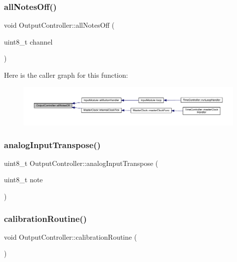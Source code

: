 \subsubsection{\texorpdfstring{all\+Notes\+Off()}{allNotesOff()}}
{\footnotesize\ttfamily void Output\+Controller\+::all\+Notes\+Off (\begin{DoxyParamCaption}\item[{uint8\+\_\+t}]{channel }\end{DoxyParamCaption})}

Here is the caller graph for this function\+:
\nopagebreak
\begin{figure}[H]
\begin{center}
\leavevmode
\includegraphics[width=350pt]{class_output_controller_abd6a1e2af3b0e92a53f5e16292958c10_icgraph}
\end{center}
\end{figure}
\mbox{\label{class_output_controller_a0996e6ff4b474cc584d532f8b05416ac}} 
\subsubsection{\texorpdfstring{analog\+Input\+Transpose()}{analogInputTranspose()}}
{\footnotesize\ttfamily uint8\+\_\+t Output\+Controller\+::analog\+Input\+Transpose (\begin{DoxyParamCaption}\item[{uint8\+\_\+t}]{note }\end{DoxyParamCaption})}

\mbox{\label{class_output_controller_a08b99c2f97e05cebeab1cbc9f680d8a9}} 
\subsubsection{\texorpdfstring{calibration\+Routine()}{calibrationRoutine()}}
{\footnotesize\ttfamily void Output\+Controller\+::calibration\+Routine (\begin{DoxyParamCaption}{ }\end{DoxyParamCaption})}

